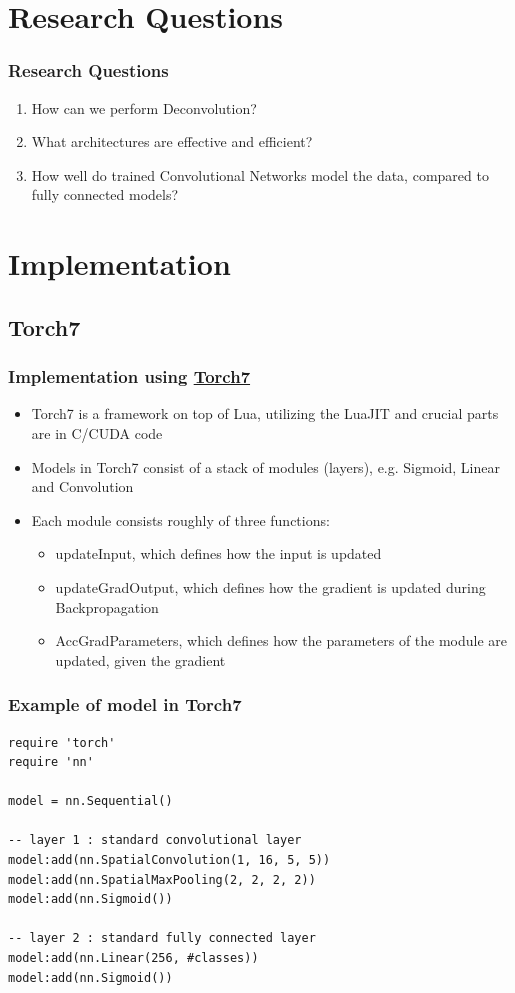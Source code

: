 \documentclass{beamer}
\begin{document}
\section{Research Questions}
\begin{frame}
\frametitle{Research Questions}
\begin{enumerate}
	\item How can we perform Deconvolution?
	\item What architectures are effective and efficient?
	\item How well do trained Convolutional Networks model the data, compared to fully connected models?
\end{enumerate}
\end{frame}

\section{Implementation}

\subsection{Torch7}
\begin{frame}
\frametitle{Implementation using \href{http://torch.ch/}{Torch7}}
\begin{itemize}
	\item Torch7 is a framework on top of Lua, utilizing the LuaJIT and crucial parts are in C/CUDA code
	\item Models in Torch7 consist of a stack of modules (layers), e.g. Sigmoid, Linear and Convolution
	\item Each module consists roughly of three functions:
		\begin{itemize}
			\item updateInput, which defines how the input is updated
			\item updateGradOutput, which defines how the gradient is updated during Backpropagation
			\item AccGradParameters, which defines how the parameters of the module are updated, given the gradient
		\end{itemize}
\end{itemize}
\end{frame}

\begin{frame}[fragile]
\frametitle{Example of model in Torch7}
\begin{lstlisting}
require 'torch'
require 'nn'

model = nn.Sequential()

-- layer 1 : standard convolutional layer
model:add(nn.SpatialConvolution(1, 16, 5, 5))
model:add(nn.SpatialMaxPooling(2, 2, 2, 2))
model:add(nn.Sigmoid())

-- layer 2 : standard fully connected layer
model:add(nn.Linear(256, #classes))
model:add(nn.Sigmoid())

\end{lstlisting}
\end{frame}
\end{document}
